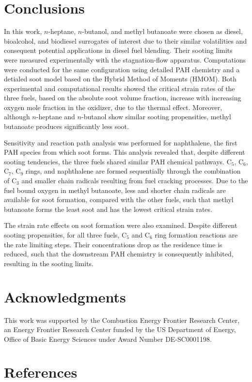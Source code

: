 \documentclass[review,3p,times]{elsarticleUS}
\begin{document}
\section{Conclusions}           

In this work, $n$-heptane, $n$-butanol, and methyl butanoate were chosen as diesel, bioalcohol, and biodiesel surrogates of interest due to their similar volatilities and consequent potential applications in diesel fuel blending. Their sooting limits were measured experimentally with the stagnation-flow apparatus. Computations were conducted for the same configuration using detailed PAH chemistry and a detialed soot model based on the Hybrid Method of Moments (HMOM). Both experimental and computational results showed the critical strain rates of the three fuels, based on the absolute soot volume fraction, increase with increasing oxygen mole fraction in the oxidizer, due to the thermal effect. Moreover, although $n$-heptane and $n$-butanol show similar sooting propensities, methyl butanoate produces significantly less soot.

Sensitivity and reaction path analysis was performed for naphthalene, the first PAH species from which soot forms. This analysis revealed that, despite different sooting tendencies, the three fuels shared similar PAH chemical pathways. C$_5$, C$_6$, C$_7$, C$_9$ rings, and naphthalene are formed sequentially through the combination of C$_3$ and smaller chain radicals resulting from fuel cracking processes. Due to the fuel bound oxygen in methyl butanoate, less and shorter chain radicals are available for soot formation, compared with the other fuels, such that methyl butanoate forms the least soot and has the lowest critical strain rates.

The strain rate effects on soot formation were also examined. Despite different sooting propensities, for all three fuels, C$_5$ and C$_6$ ring formation reactions are the rate limiting steps. Their concentrations drop as the residence time is reduced, such that the downstream PAH chemistry is consequently inhibited, resulting in the sooting limits.


\section*{Acknowledgments}
This work was supported by the Combustion Energy Frontier Research Center, an Energy Frontier Research Center funded by the US Department of Energy, Office of Basic Energy Sciences under Award Number DE-SC0001198.

\section*{References}



\renewcommand{\thefigure}{\arabic{figure}}
\renewcommand{\thetable}{\arabic{table}}
\end{document}
